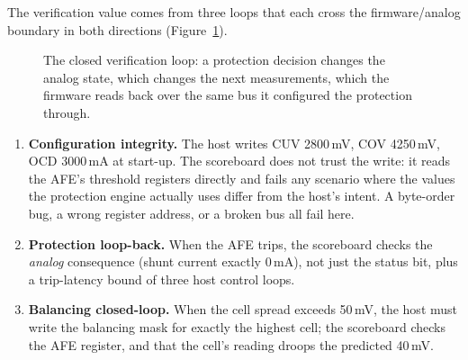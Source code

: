 \documentclass[11pt]{article}
\newcommand{\iic}{I\textsuperscript{2}C}
\begin{document}
The verification value comes from three loops that each cross the
firmware/analog boundary in both directions
(Figure~\ref{fig:loop}).

\begin{figure}[htbp]
\centering
{}
\caption{The closed verification loop: a protection decision changes
the analog state, which changes the next measurements, which the
firmware reads back over the same bus it configured the protection
through.}
\label{fig:loop}
\end{figure}

\begin{enumerate}
  \item \textbf{Configuration integrity.}  The host writes CUV
    2800\,mV, COV 4250\,mV, OCD 3000\,mA at start-up.  The scoreboard
    does not trust the write: it reads the AFE's threshold registers
    directly and fails any scenario where the values the protection
    engine actually uses differ from the host's intent.  A byte-order
    bug, a wrong register address, or a broken bus all fail here.
  \item \textbf{Protection loop-back.}  When the AFE trips, the
    scoreboard checks the \emph{analog} consequence (shunt current
    exactly 0\,mA), not just the status bit, plus a trip-latency
    bound of three host control loops.
  \item \textbf{Balancing closed-loop.}  When the cell spread exceeds
    50\,mV, the host must write the balancing mask for exactly the
    highest cell; the scoreboard checks the AFE register, and that the
    cell's reading droops the predicted 40\,mV.
\end{enumerate}
\end{document}

